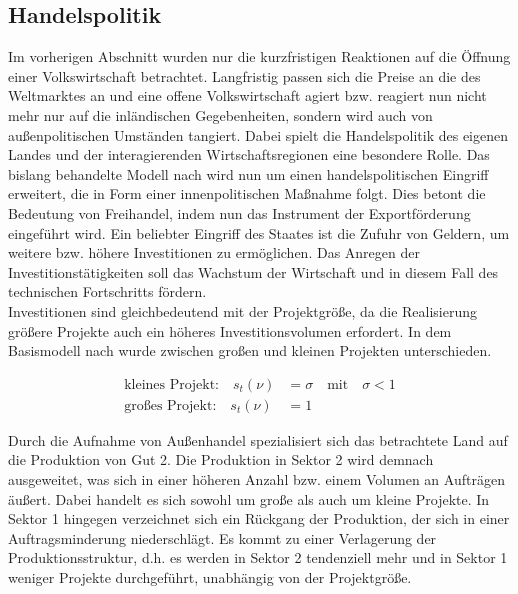 \subsection{Handelspolitik}\label{sec:Handelspolitik}
Im vorherigen Abschnitt wurden nur die kurzfristigen Reaktionen auf die Öffnung einer Volkswirtschaft betrachtet. Langfristig passen sich die Preise an die des Weltmarktes an und eine offene Volkswirtschaft agiert bzw. reagiert nun nicht mehr nur auf die inländischen Gegebenheiten, sondern wird auch von au{\ss}enpolitischen Umständen tangiert. Dabei spielt die Handelspolitik des eigenen Landes und der interagierenden Wirtschaftsregionen eine besondere Rolle. Das bislang behandelte Modell nach \citet{Acemoglu.2006} wird nun um einen handelspolitischen Eingriff erweitert, die in Form einer innenpolitischen Ma{\ss}nahme folgt. Dies betont die Bedeutung von Freihandel, indem nun das Instrument der Exportförderung eingeführt wird. Ein beliebter Eingriff des Staates ist die Zufuhr von Geldern, um weitere bzw. höhere Investitionen zu ermöglichen. Das Anregen der Investitionstätigkeiten soll das Wachstum der Wirtschaft und in diesem Fall des technischen Fortschritts fördern.\\
Investitionen sind gleichbedeutend mit der Projektgrö{\ss}e, da die Realisierung grö{\ss}ere Projekte auch ein höheres Investitionsvolumen erfordert. In dem Basismodell nach \citet{Acemoglu.2006} wurde zwischen gro{\ss}en und kleinen Projekten unterschieden. 


	\begin{align*}
		\text{kleines Projekt:}\quad s_t(\nu) &= \sigma\quad \text{mit}\quad\sigma < 1 \\
		\text{gro{\ss}es Projekt:}\quad s_t(\nu) &= 1
	\end{align*}


Durch die Aufnahme von Au{\ss}enhandel spezialisiert sich das betrachtete Land auf die Produktion von Gut 2. Die Produktion in Sektor 2 wird demnach ausgeweitet, was sich in einer höheren Anzahl bzw. einem Volumen an Aufträgen äu{\ss}ert. Dabei handelt es sich sowohl um gro{\ss}e als auch um kleine Projekte. In Sektor 1 hingegen verzeichnet sich ein Rückgang der Produktion, der sich in einer Auftragsminderung niederschlägt. Es kommt zu einer Verlagerung der Produktionsstruktur, d.h. es werden in Sektor 2 tendenziell mehr und in Sektor 1 weniger Projekte durchgeführt, unabhängig von der Projektgrö{\ss}e.\\


